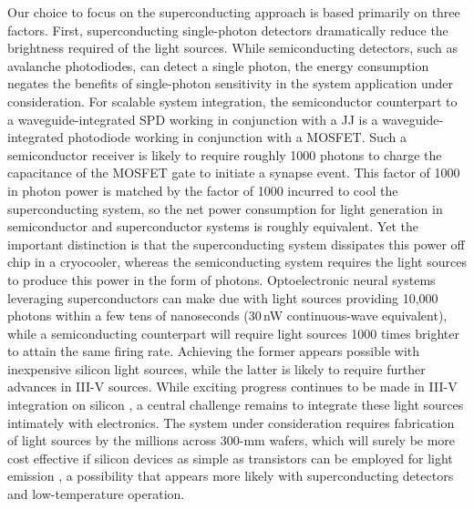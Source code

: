 \documentclass[twocolumn]{article}
\begin{document}
Our choice to focus on the superconducting approach is based primarily on three factors. First, superconducting single-photon detectors dramatically reduce the brightness required of the light sources. While semiconducting detectors, such as avalanche photodiodes, can detect a single photon, the energy consumption negates the benefits of single-photon sensitivity in the system application under consideration. For scalable system integration, the semiconductor counterpart to a waveguide-integrated SPD working in conjunction with a JJ is a waveguide-integrated photodiode working in conjunction with a MOSFET. Such a semiconductor receiver is likely to require roughly 1000 photons to charge the capacitance of the MOSFET gate \cite{mi2017} to initiate a synapse event. This factor of 1000 in photon power is matched by the factor of 1000 incurred to cool the superconducting system, so the net power consumption for light generation in semiconductor and superconductor systems is roughly equivalent. Yet the important distinction is that the superconducting system dissipates this power off chip in a cryocooler, whereas the semiconducting system requires the light sources to produce this power in the form of photons. Optoelectronic neural systems leveraging superconductors can make due with light sources providing 10,000 photons within a few tens of nanoseconds (30\,nW continuous-wave equivalent), while a semiconducting counterpart will require light sources 1000 times brighter to attain the same firing rate. Achieving the former appears possible with inexpensive silicon light sources, while the latter is likely to require further advances in III-V sources. While exciting progress continues to be made in III-V integration on silicon \cite{tapa2019,hala2020}, a central challenge remains to integrate these light sources intimately with electronics. The system under consideration requires fabrication of light sources by the millions across 300-mm wafers, which will surely be more cost effective if silicon devices as simple as transistors can be employed for light emission \cite{buch2017}, a possibility that appears more likely with superconducting detectors and low-temperature operation.
\end{document}

